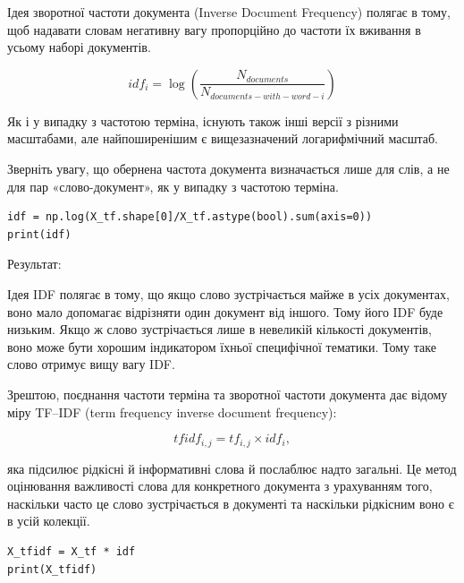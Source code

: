 Ідея зворотної частоти документа (Inverse Document Frequency) полягає в тому, щоб надавати словам негативну вагу пропорційно до частоти їх вживання в усьому наборі документів.

$$idf_{i} = \log( \frac{N_{documents}}{N_{documents-with-word-i}} )$$

Як і у випадку з частотою терміна, існують також інші версії з різними масштабами, але найпоширенішим є вищезазначений логарифмічний масштаб.

Зверніть увагу, що обернена частота документа визначається лише для слів, а не для пар «слово-документ», як у випадку з частотою терміна.


\begin{lstlisting}
idf = np.log(X_tf.shape[0]/X_tf.astype(bool).sum(axis=0))
print(idf)
\end{lstlisting}

Результат:

\begin{console}
[1.09861229 1.09861229 1.09861229 1.09861229 0.40546511 0.40546511
 1.09861229 1.09861229 1.09861229 1.09861229 1.09861229 1.09861229
 1.09861229 1.09861229 1.09861229 1.09861229 1.09861229 1.09861229
 1.09861229 1.09861229 1.09861229 1.09861229 1.09861229 1.09861229
 0.40546511 1.09861229 1.09861229 1.09861229 1.09861229 1.09861229
 1.09861229 1.09861229 1.09861229 0.         0.40546511 1.09861229
 1.09861229 1.09861229 1.09861229 1.09861229 1.09861229 1.09861229
 1.09861229 0.40546511]
\end{console}

Ідея IDF полягає в тому, що якщо слово зустрічається майже в усіх документах, воно мало допомагає відрізняти один документ від іншого. Тому його IDF буде низьким. Якщо ж слово зустрічається лише в невеликій кількості документів, воно може бути хорошим індикатором їхньої специфічної тематики. Тому таке слово отримує вищу вагу IDF.

Зрештою, поєднання частоти терміна та зворотної частоти документа дає відому міру TF–IDF (term frequency inverse document frequency): 

$$tfidf_{i,j}=tf_{i,j}\times idf_{i},$$

яка підсилює рідкісні й інформативні слова й послаблює надто загальні. Це метод оцінювання важливості слова для конкретного документа з урахуванням того, наскільки часто це слово зустрічається в документі та наскільки рідкісним воно є в усій колекції.


\begin{lstlisting}
X_tfidf = X_tf * idf
print(X_tfidf)
\end{lstlisting}

